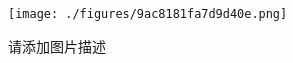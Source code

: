 
\begin{figure}[ht]
\centering
\texttt{[image: ./figures/9ac8181fa7d9d40e.png]}
\caption{请添加图片描述} \label{fig_test2_5}
\end{figure}